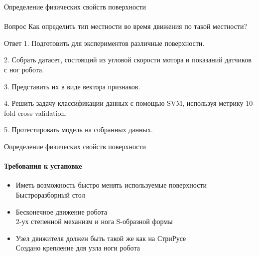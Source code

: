 \documentclass[aspectratio=169,xcolor=table]{beamer}
\begin{document}
\begin{frame}[t]{Определение физических свойств поверхности}
    \framesubtitle{}
    \vspace{-0.3cm}
    {\large\begin{block}{Вопрос}
        Как определить тип местности во время движения по такой местности?
        \end{block}}
    {\large\begin{alertblock}{Ответ}
        1. Подготовить для экспериментов различные поверхности.

        2. Собрать датасет, состоящий из угловой скорости мотора и показаний датчиков с ног робота.

        3. Представить их в виде вектора признаков.

        4. Решить задачу классификации данных с помощью SVM, используя метрику 10-fold cross validation. 

        5. Протестировать модель на собранных данных.
        \end{alertblock}}
\end{frame}

\begin{frame}[t]{Определение физических свойств поверхности}
    \framesubtitle{Требования к установке}
            \begin{itemize}
                \item Иметь возможность быстро менять используемые поверхности {\\ \alert{Быстроразборный стол}}
                \item Бесконечное движение робота {\\ \alert{2-ух степенной механизм и нога S-образной формы}}
                \item Узел движителя должен быть такой же как на СтриРусе {\\ \alert{Создано крепление для узла ноги робота}}
            \end{itemize}

\end{frame}
\end{document}
